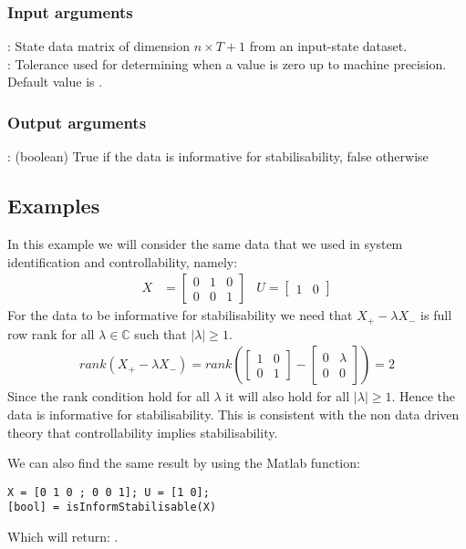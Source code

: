 \subsubsection*{Input arguments}
\textbf{}: State data matrix of dimension $n \times T+1$ from an input-state dataset. \\ 
\textbf{}: Tolerance used for determining when a value is zero up to machine precision. Default value is .

\subsubsection*{Output arguments}
\textbf{}: (boolean) True if the data is informative for stabilisability, false otherwise\\

\subsection{Examples}
In this example we will consider the same data that we used in system identification and controllability, namely:
\begin{align*}
X &= \begin{bmatrix} 0&1&0 \\ 0&0&1 \end{bmatrix} & U = \begin{bmatrix}	1&0	\end{bmatrix}
\end{align*} 
For the data to be informative for stabilisability we need that $X_+ - \lambda X_-$ is full row rank for all $\lambda \in \mathbb{C}$ such that $|\lambda| \geq 1$.
\begin{align*}
rank(X_+ - \lambda X_-) = rank\left(\begin{bmatrix} 1&0\\0&1\end{bmatrix} - \begin{bmatrix} 0&\lambda\\0&0\end{bmatrix}\right) = 2
\end{align*}
Since the rank condition hold for all $\lambda$ it will also hold for all $|\lambda| \geq 1$. Hence the data is informative for stabilisability. This is consistent with the non data driven theory that controllability implies stabilisability. 

We can also find the same result by using the Matlab function:
\begin{lstlisting}
X = [0 1 0 ; 0 0 1]; U = [1 0];
[bool] = isInformStabilisable(X)
\end{lstlisting}
Which will return: \mon{[ 1 ]}.

